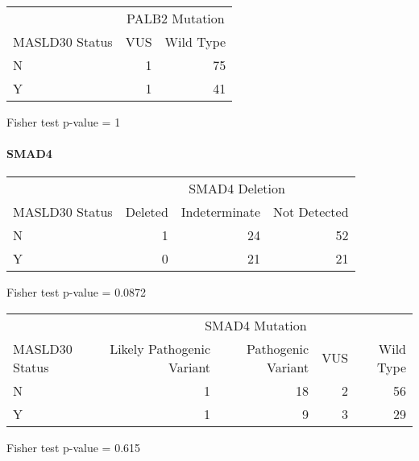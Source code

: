 \documentclass[
]{article}
\begin{document}
\begingroup
\fontsize{12.0pt}{14.4pt}\selectfont
\setlength{\LTpost}{0mm}
\begin{longtable}{l|rr}
\toprule
 & \multicolumn{2}{c}{PALB2 Mutation} \\ 
\cmidrule(lr){2-3}
MASLD30 Status & VUS & Wild Type \\ 
\midrule\addlinespace[2.5pt]
N & 1 & 75 \\ 
Y & 1 & 41 \\ 
\bottomrule
\end{longtable}
\begin{minipage}{\linewidth}
Fisher test p-value =  1\\
\end{minipage}
\endgroup
\pagebreak

\hypertarget{smad4}{%
\paragraph{SMAD4}\label{smad4}}

\begingroup
\fontsize{12.0pt}{14.4pt}\selectfont
\setlength{\LTpost}{0mm}
\begin{longtable}{l|rrr}
\toprule
 & \multicolumn{3}{c}{SMAD4 Deletion} \\ 
\cmidrule(lr){2-4}
MASLD30 Status & Deleted & Indeterminate & Not Detected \\ 
\midrule\addlinespace[2.5pt]
N & 1 & 24 & 52 \\ 
Y & 0 & 21 & 21 \\ 
\bottomrule
\end{longtable}
\begin{minipage}{\linewidth}
Fisher test p-value =  0.0872\\
\end{minipage}
\endgroup

\begingroup
\fontsize{12.0pt}{14.4pt}\selectfont
\setlength{\LTpost}{0mm}
\begin{longtable}{l|rrrr}
\toprule
 & \multicolumn{4}{c}{SMAD4 Mutation} \\ 
\cmidrule(lr){2-5}
MASLD30 Status & Likely Pathogenic Variant & Pathogenic Variant & VUS & Wild Type \\ 
\midrule\addlinespace[2.5pt]
N & 1 & 18 & 2 & 56 \\ 
Y & 1 & 9 & 3 & 29 \\ 
\bottomrule
\end{longtable}
\begin{minipage}{\linewidth}
Fisher test p-value =  0.615\\
\end{minipage}
\endgroup
\pagebreak
\end{document}
